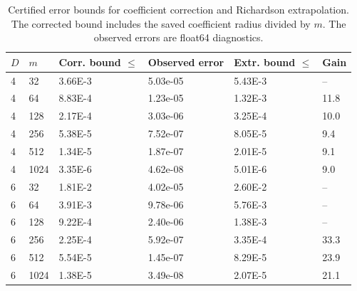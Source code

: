 \begin{table}[htbp]
\centering
\caption{Certified error bounds for coefficient correction and Richardson extrapolation. The corrected bound includes the saved coefficient radius divided by $m$. The observed errors are float64 diagnostics.}
\label{tab:sharp_remainders}
\begin{tabular}{llllll}
\toprule
$D$ & $m$ & Corr. bound $\leq$ & Observed error & Extr. bound $\leq$ & Gain \\
\midrule
4 & 32 & 3.66E-3 & 5.03e-05 & 5.43E-3 & -- \\
4 & 64 & 8.83E-4 & 1.23e-05 & 1.32E-3 & 11.8 \\
4 & 128 & 2.17E-4 & 3.03e-06 & 3.25E-4 & 10.0 \\
4 & 256 & 5.38E-5 & 7.52e-07 & 8.05E-5 & 9.4 \\
4 & 512 & 1.34E-5 & 1.87e-07 & 2.01E-5 & 9.1 \\
4 & 1024 & 3.35E-6 & 4.62e-08 & 5.01E-6 & 9.0 \\
6 & 32 & 1.81E-2 & 4.02e-05 & 2.60E-2 & -- \\
6 & 64 & 3.91E-3 & 9.78e-06 & 5.76E-3 & -- \\
6 & 128 & 9.22E-4 & 2.40e-06 & 1.38E-3 & -- \\
6 & 256 & 2.25E-4 & 5.92e-07 & 3.35E-4 & 33.3 \\
6 & 512 & 5.54E-5 & 1.45e-07 & 8.29E-5 & 23.9 \\
6 & 1024 & 1.38E-5 & 3.49e-08 & 2.07E-5 & 21.1 \\
\bottomrule
\end{tabular}
\end{table}
